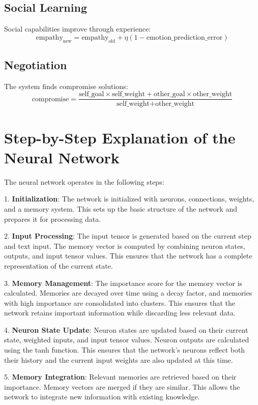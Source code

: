 \documentclass{article}
\begin{document}
\subsection{Social Learning}
Social capabilities improve through experience:
\[
\text{empathy}_{\text{new}} = \text{empathy}_{\text{old}} + \eta(1 - \text{emotion\_prediction\_error})
\]

\subsection{Negotiation}
The system finds compromise solutions:
\[
\text{compromise} = \frac{\text{self\_goal} \times \text{self\_weight} + \text{other\_goal} \times \text{other\_weight}}{\text{self\_weight} + \text{other\_weight}}
\]

\section{Step-by-Step Explanation of the Neural Network}
The neural network operates in the following steps:

1. \textbf{Initialization}: The network is initialized with neurons, connections, weights, and a memory system. This sets up the basic structure of the network and prepares it for processing data.

2. \textbf{Input Processing}: The input tensor is generated based on the current step and text input. The memory vector is computed by combining neuron states, outputs, and input tensor values. This ensures that the network has a complete representation of the current state.

3. \textbf{Memory Management}: The importance score for the memory vector is calculated. Memories are decayed over time using a decay factor, and memories with high importance are consolidated into clusters. This ensures that the network retains important information while discarding less relevant data.

4. \textbf{Neuron State Update}: Neuron states are updated based on their current state, weighted inputs, and input tensor values. Neuron outputs are calculated using the tanh function. This ensures that the network's neurons reflect both their history and the current input weights are also updated at this time.

5. \textbf{Memory Integration}: Relevant memories are retrieved based on their importance. Memory vectors are merged if they are similar. This allows the network to integrate new information with existing knowledge.
\end{document}
